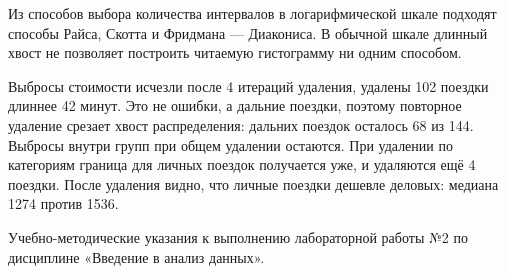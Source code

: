 \documentclass[a4paper,14pt]{extarticle}
\begin{document}
Из способов выбора количества интервалов в логарифмической шкале подходят способы Райса, Скотта и Фридмана — Диакониса. В обычной шкале длинный хвост не позволяет построить читаемую гистограмму ни одним способом.

Выбросы стоимости исчезли после 4 итераций удаления, удалены 102 поездки длиннее 42 минут. Это не ошибки, а дальние поездки, поэтому повторное удаление срезает хвост распределения: дальних поездок осталось 68 из 144. Выбросы внутри групп при общем удалении остаются. При удалении по категориям граница для личных поездок получается уже, и удаляются ещё 4 поездки. После удаления видно, что личные поездки дешевле деловых: медиана 1274 против 1536.

\suaisources
Учебно-методические указания к выполнению лабораторной работы №2 по дисциплине «Введение в анализ данных».
\end{document}
